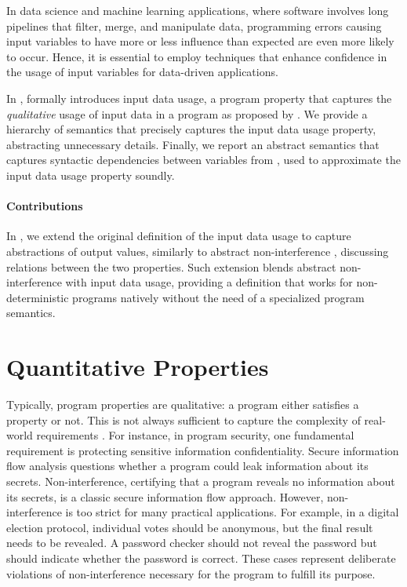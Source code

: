 In data science and machine learning applications, where software involves long pipelines that filter, merge, and manipulate data, programming errors causing input variables to have more or less influence than expected are even more likely to occur.
Hence, it is essential to employ techniques that enhance confidence in the usage of input variables for data-driven applications.


In ,  formally introduces input data usage, a program property that captures the \emph{qualitative} usage of input data in a program as proposed by \textcite{Urban2018}.
We provide a hierarchy of semantics that precisely captures the input data usage property, abstracting unnecessary details.
Finally, we report an abstract semantics that captures syntactic dependencies between variables from , used to approximate the input data usage property soundly.


\paragraph{Contributions}

In , we extend the original definition of the input data usage to capture abstractions of output values, similarly to abstract non-interference , discussing relations between the two properties.
Such extension blends abstract non-interference with input data usage, providing a definition that works for non-deterministic programs natively without the need of a specialized program semantics.


\section{Quantitative Properties}
Typically, program properties are qualitative: a program either satisfies a property or not.
This is not always sufficient to capture the complexity of real-world requirements .
For instance, in program security, one fundamental requirement is protecting sensitive information confidentiality.
Secure information flow analysis questions whether a program could leak information about its secrets.
Non-interference, certifying that a program reveals no information about its secrets, is a classic secure information flow approach.
However, non-interference is too strict for many practical applications.
For example, in a digital election protocol, individual votes should be anonymous, but the final result needs to be revealed.
A password checker should not reveal the password but should indicate whether the password is correct.
These cases represent deliberate violations of non-interference necessary for the program to fulfill its purpose.

